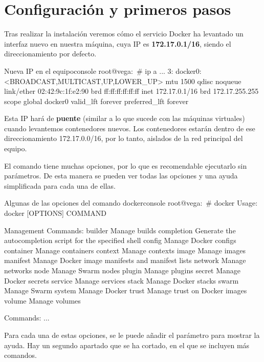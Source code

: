 \section{Configuración y primeros pasos}

Tras realizar la instalación veremos cómo el servicio Docker ha levantado un interfaz nuevo en nuestra máquina, cuya IP es \textbf{172.17.0.1/16}, siendo el direccionamiento por defecto.

\begin{mycode}{Nueva IP en el equipo}{console}{}
root@vega:~# ip a
...
3: docker0: <BROADCAST,MULTICAST,UP,LOWER_UP> mtu 1500 qdisc noqueue
    link/ether 02:42:9c:1f:e2:90 brd ff:ff:ff:ff:ff:ff
    inet 172.17.0.1/16 brd 172.17.255.255 scope global docker0
      valid_lft forever preferred_lft forever
\end{mycode}

Esta IP hará de \textbf{puente} (similar a lo que sucede con las máquinas virtuales) cuando levantemos contenedores nuevos. Los contenedores estarán dentro de ese direccionamiento 172.17.0.0/16, por lo tanto, aislados de la red principal del equipo.


El comando  tiene muchas opciones, por lo que es recomendable ejecutarlo sin parámetros. De esta manera se pueden ver todas las opciones y una ayuda simplificada para cada una de ellas.

\begin{mycode}{Algunas de las opciones del comando docker}{console}{}
root@vega:~# docker
Usage:  docker [OPTIONS] COMMAND

Management Commands:
builder     Manage builds
completion  Generate the autocompletion script for the specified shell
config      Manage Docker configs
container   Manage containers
context     Manage contexts
image       Manage images
manifest    Manage Docker image manifests and manifest lists
network     Manage networks
node        Manage Swarm nodes
plugin      Manage plugins
secret      Manage Docker secrets
service     Manage services
stack       Manage Docker stacks
swarm       Manage Swarm
system      Manage Docker
trust       Manage trust on Docker images
volume      Manage volumes

Commands:
...
\end{mycode}

Para cada una de estas opciones, se le puede añadir el parámetro  para mostrar la ayuda. Hay un segundo apartado que se ha cortado, en el que se incluyen más comandos.

